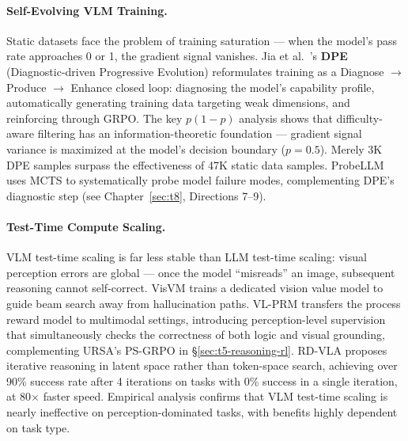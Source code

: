 \paragraph{Self-Evolving VLM Training.}
Static datasets face the problem of training saturation --- when the model's pass rate approaches 0 or 1, the gradient signal vanishes.
Jia et al.\ \cite{jia2026dpe}'s \textbf{DPE} (Diagnostic-driven Progressive Evolution)
reformulates training as a Diagnose $\rightarrow$ Produce $\rightarrow$ Enhance closed loop:
diagnosing the model's capability profile, automatically generating training data targeting weak dimensions, and reinforcing through GRPO.
The key $p(1-p)$ analysis shows that difficulty-aware filtering has an information-theoretic foundation ---
gradient signal variance is maximized at the model's decision boundary ($p=0.5$).
Merely 3K DPE samples surpass the effectiveness of 47K static data samples.
ProbeLLM \cite{huang2026probellm} uses MCTS to systematically probe model failure modes,
complementing DPE's diagnostic step
(see Chapter~\ref{sec:t8}, Directions 7--9).

\paragraph{Test-Time Compute Scaling.}
\label{sec:t5-test-time-compute}
VLM test-time scaling is far less stable than LLM test-time scaling:
visual perception errors are global --- once the model ``misreads'' an image, subsequent reasoning cannot self-correct.
VisVM \cite{wang2024visvm} trains a dedicated vision value model to guide beam search away from hallucination paths.
VL-PRM \cite{ong2025vlprm} transfers the process reward model to multimodal settings,
introducing perception-level supervision that simultaneously checks the correctness of both logic and visual grounding,
complementing URSA's PS-GRPO in \S\ref{sec:t5-reasoning-rl}.
RD-VLA \cite{tur2026rdvla} proposes iterative reasoning in latent space rather than token-space search,
achieving over 90\% success rate after 4 iterations on tasks with 0\% success in a single iteration, at 80$\times$ faster speed.
Empirical analysis \cite{ahmadpour2025ttsvisonlanguage} confirms that VLM test-time scaling
is nearly ineffective on perception-dominated tasks, with benefits highly dependent on task type.

